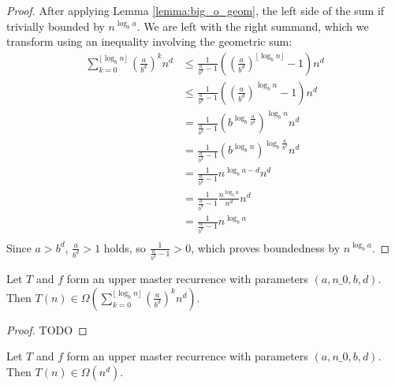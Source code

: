 \begin{proof}
    \leanok
    After applying Lemma \ref{lemma:big_o_geom}, the left side of the sum if 
    trivially bounded by $n^{\log_b{a}}$. We are left with the right summand, 
    which we transform using an inequality involving the geometric sum:
    \begin{align*}
        \sum_{k=0}^{\lfloor \log_b{n} \rfloor} (\frac{a}{b^d})^k n^d
            &\leq \frac{1}{\frac{a}{b^d} - 1}
                    ((\frac{a}{b^d})^{\lfloor \log_b{n} \rfloor} - 1) n^d \\
            &\leq \frac{1}{\frac{a}{b^d} - 1}
                    ((\frac{a}{b^d})^{\log_b{n}} - 1) n^d \\
            &= \frac{1}{\frac{a}{b^d} - 1}
                    (b^{\log_b{\frac{a}{b^d}}})^{\log_b{n}} n^d \\
            &= \frac{1}{\frac{a}{b^d} - 1}
                    (b^{\log_b{n}})^{\log_b{\frac{a}{b^d}}} n^d \\
            &= \frac{1}{\frac{a}{b^d} - 1}
                    n^{\log_b{a} - d} n^d \\
            &= \frac{1}{\frac{a}{b^d} - 1}
                    \frac{n^{\log_b{a}}}{n^d} n^d \\
            &= \frac{1}{\frac{a}{b^d} - 1}
                    n^{\log_b{a}} \\
    \end{align*}
    Since $a > b^d$, $\frac{a}{b^d} > 1$ holds, so 
    $\frac{1}{\frac{a}{b^d} - 1} > 0$, which proves boundedness by 
    $n^{\log_b{a}}$.
\end{proof}


\begin{lemma}
    \label{lemma:big_omega_geom}
    \leanok
    Let $T$ and $f$ form an upper master recurrence with parameters 
    $(a, n\_0, b, d)$. Then $T(n) \in 
    \Omega(\sum_{k=0}^{\lfloor \log_b{n} \rfloor} (\frac{a}{b^d})^k n^d)$.
\end{lemma}

\begin{proof}
    \notready
    TODO
\end{proof}

\begin{theorem}
    \label{thm:upper_master_rec_big_omega}
    \leanok
    Let $T$ and $f$ form an upper master recurrence with parameters 
    $(a, n\_0, b, d)$. Then $T(n) \in \Omega(n^d)$.
\end{theorem}

